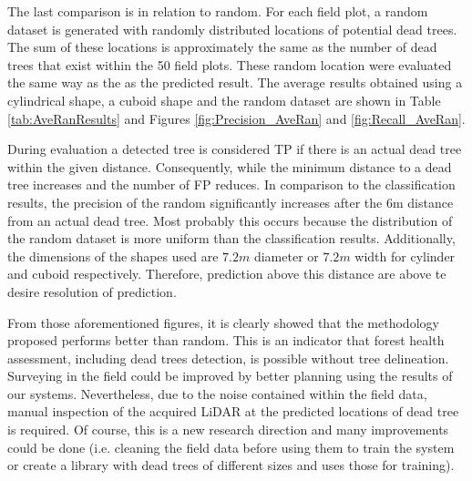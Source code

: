 \documentclass{subfiles}
\begin{document}
        \par The last comparison is in relation to random. For each field plot, a random dataset is generated with randomly distributed locations of potential dead trees. The sum of these locations is approximately the same as the number of dead trees that exist within the 50 field plots. These random location were evaluated the same way as the as the predicted result. The average results obtained using a cylindrical shape, a cuboid shape and the random dataset are shown in Table \ref{tab:AveRanResults} and Figures \ref{fig:Precision_AveRan} and \ref{fig:Recall_AveRan}.{\color{blue} During evaluation a detected tree is considered TP if there is an actual dead tree within the given distance.  Consequently, while the minimum distance to a dead tree increases and the number of FP reduces. In comparison to the classification results, the precision of the random significantly increases after the 6m distance from an actual dead tree. Most probably this occurs because the distribution of the random dataset is more uniform than the classification results. Additionally, the dimensions of the shapes used are $7.2m$ diameter or $7.2m$ width for cylinder and cuboid respectively. Therefore, prediction above this distance are above te desire resolution of prediction. 
        \par From those aforementioned figures, it is clearly showed that the methodology proposed performs better than random. This is an indicator that forest health assessment, including dead trees detection, is possible without tree delineation. Surveying in the field could be improved by better planning using the results of our systems. Nevertheless, due to the noise contained within the field data, manual inspection of the acquired LiDAR at the predicted locations of dead tree is required. Of course, this is a new research direction and many improvements could be done (i.e. cleaning the field data before using them to train the system or create a library with dead trees of different sizes and uses those for training). 
        }
        
\end{document}
